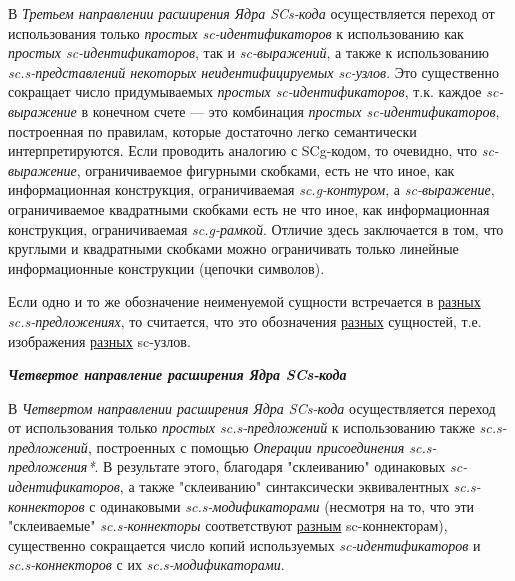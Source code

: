 В \textit{Третьем направлении расширения Ядра SCs-кода} осуществляется переход от использования только \textit{простых sc-идентификаторов} к использованию как \textit{простых sc-идентификаторов}, так и \textit{sc-выражений}, а также к использованию \textit{sc.s-представлений некоторых неидентифицируемых sc-узлов}. Это существенно сокращает число придумываемых \textit{простых sc-идентификаторов}, т.к. каждое \textit{sc-выражение} в конечном счете — это комбинация \textit{простых sc-идентификаторов}, построенная по правилам, которые достаточно легко семантически интерпретируются. Если проводить аналогию с SCg-кодом, то очевидно, что \textit{\mbox{sc-выражение}}, ограничиваемое фигурными скобками, есть не что иное, как информационная конструкция, ограничиваемая \textit{sc.g-контуром}, а \textit{sc-выражение}, ограничиваемое квадратными скобками есть не что иное, как информационная конструкция, ограничиваемая \textit{sc.g-рамкой}. Отличие здесь заключается в том, что круглыми и квадратными скобками можно ограничивать только линейные информационные конструкции (цепочки символов).

\begin{SCn}
\end{SCn}

Если одно и то же обозначение неименуемой сущности встречается в \uline{разных} \textit{sc.s-предложениях}, то считается, что это обозначения \uline{разных} сущностей, т.е. изображения \uline{разных} sc-узлов.

\textbf{\textit{Четвертое направление расширения Ядра SCs-кода}}

В \textit{Четвертом направлении расширения Ядра SCs-кода} осуществляется переход от использования только \textit{простых sc.s-предложений} к использованию также \textit{sc.s-предложений}, построенных с помощью \textit{\mbox{Операции} присоединения sc.s-предложения*}. В результате этого, благодаря "склеиванию"{} одинаковых \textit{\mbox{sc-идентификаторов}}, а также "склеиванию"{} синтаксически эквивалентных \textit{\mbox{sc.s-коннекторов}} с одинаковыми \textit{\mbox{sc.s-модификаторами}} (несмотря на то, что эти "склеиваемые"{} \textit{sc.s-коннекторы} соответствуют \uline{разным} \mbox{sc-коннекторам}), существенно сокращается число копий используемых \textit{\mbox{sc-идентификаторов}} и \textit{\mbox{sc.s-коннекторов}} с их \textit{\mbox{sc.s-модификаторами}}.

